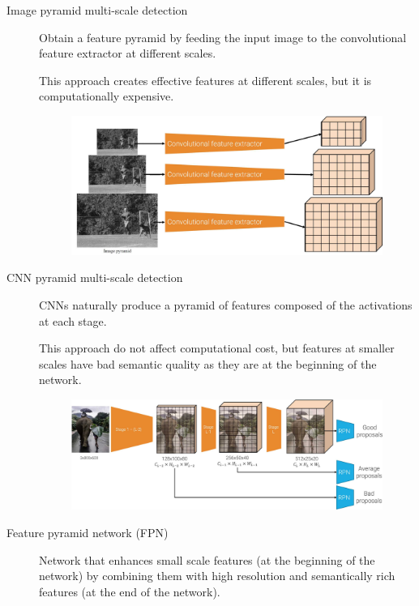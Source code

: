 \begin{description}
    \item[Image pyramid multi-scale detection] 
        Obtain a feature pyramid by feeding the input image to the convolutional feature extractor at different scales.

        \begin{remark}
            This approach creates effective features at different scales, but it is computationally expensive.
        \end{remark}

        \begin{figure}[H]
            \centering
            \includegraphics[width=0.6\linewidth]{./img/_image_pyramid_multi_scale.jpg}
        \end{figure}

    \item[CNN pyramid multi-scale detection] 
        CNNs naturally produce a pyramid of features composed of the activations at each stage.

        \begin{remark}
            This approach do not affect computational cost, but features at smaller scales have bad semantic quality as they are at the beginning of the network.
        \end{remark}

        \begin{figure}[H]
            \centering
            \includegraphics[width=0.8\linewidth]{./img/_cnn_pyramid_multi_scale.jpg}
        \end{figure}

    \item[Feature pyramid network (FPN)] 
        Network that enhances small scale features (at the beginning of the network) by combining them with high resolution and semantically rich features (at the end of the network).


\end{description}
